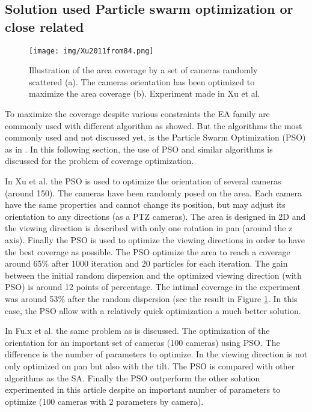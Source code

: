 \subsection{Solution used Particle swarm optimization or close related}	

\begin{figure}[t!]
	\center
{}
   \texttt{[image: img/Xu2011from84.png]}
  \caption{Illustration of  the  area coverage by a set of cameras randomly scattered (a). The cameras orientation has been optimized to maximize the  area coverage (b). Experiment made in Xu et al. \citep{84*xu2011}}\label{fig:Coverage84}
  \endminipage\hfill
\end{figure} 

To maximize the coverage despite various constraints the EA family are commonly used with different algorithm as showed. But the algorithms the most commonly used and not discussed yet, is the Particle Swarm Optimization (PSO) as in \cite{84*xu2011,8*zhou2011,33*reddy2012,143*maji2015,193*fu2014,194*fu2010,200*kulkarni2011}. In this following section, the use of PSO and similar algorithms is discussed for the problem of coverage optimization. 

 In Xu et al. \cite{84*xu2011} the PSO is used to optimize the orientation of several cameras (around 150).
The cameras have been randomly posed on the area. Each camera have the same properties and cannot change its position, but may adjust its orientation to any directions (as a PTZ cameras). The area is designed in 2D and the viewing direction is described with only one rotation in pan (around  the z axis).  
Finally the PSO is used to optimize the viewing directions in order to have the best coverage as possible. The PSO optimize the area to reach a coverage around 65\% after 1000 iteration and 20 particles for each iteration.
The gain between the initial random dispersion  and the optimized viewing direction (with PSO) is  around 12 points of percentage. The intimal coverage in the experiment was around 53\% after the random dispersion (see the result in Figure \ref{fig:Coverage84}. In this case, the PSO allow with a relatively quick optimization a much better solution.

In Fu.x et al. \cite{194*fu2010} the same problem as \cite{84*xu2011} is discussed. The optimization of the orientation for an important set of cameras (100 cameras) using PSO. The difference is the number of parameters to optimize. In \cite{194*fu2010} the viewing direction is not only optimized on pan but also with the tilt.  
The PSO is compared with other algorithms as the SA. Finally the PSO outperform the other solution experimented in this article despite an important number of parameters to optimize (100 cameras with 2 parameters by camera).

